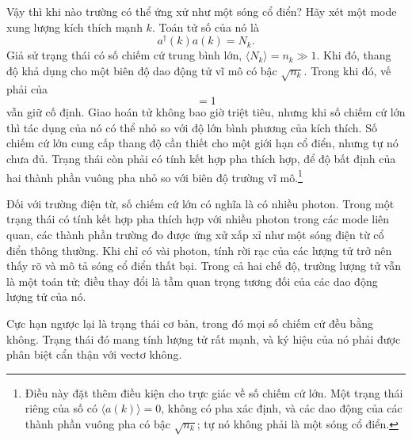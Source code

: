 Vậy thì khi nào trường có thể ứng xử như một sóng cổ điển? Hãy xét một mode xung lượng kích thích mạnh \(k\). Toán tử số của nó là
\begin{equation}
a^\dagger(k)a(k)=N_k.
\end{equation}
Giả sử trạng thái có số chiếm cứ trung bình lớn, \(\langle N_k\rangle=n_k\gg 1\). Khi đó, thang độ khả dụng cho một biên độ dao động tử vĩ mô có bậc \(\sqrt{n_k}\). Trong khi đó, vế phải của
\begin{equation}
[a(k),a^\dagger(k)]=1
\end{equation}
vẫn giữ cố định. Giao hoán tử không bao giờ triệt tiêu, nhưng khi số chiếm cứ lớn thì tác dụng của nó có thể nhỏ so với độ lớn bình phương của kích thích. Số chiếm cứ lớn cung cấp thang độ cần thiết cho một giới hạn cổ điển, nhưng tự nó chưa đủ. Trạng thái còn phải có tính kết hợp pha thích hợp, để độ bất định của hai thành phần vuông pha nhỏ so với biên độ trường vĩ mô.\footnote{Điều này đặt thêm điều kiện cho trực giác về số chiếm cứ lớn. Một trạng thái riêng của số có \(\langle a(k)\rangle=0\), không có pha xác định, và các dao động của các thành phần vuông pha có bậc \(\sqrt{n_k}\); tự nó không phải là một sóng cổ điển.}

Đối với trường điện từ, số chiếm cứ lớn có nghĩa là có nhiều photon. Trong một trạng thái có tính kết hợp pha thích hợp với nhiều photon trong các mode liên quan, các thành phần trường đo được ứng xử xấp xỉ như một sóng điện từ cổ điển thông thường. Khi chỉ có vài photon, tính rời rạc của các lượng tử trở nên thấy rõ và mô tả sóng cổ điển thất bại. Trong cả hai chế độ, trường lượng tử vẫn là một toán tử; điều thay đổi là tầm quan trọng tương đối của các dao động lượng tử của nó.

\begin{classroomqa}
\end{classroomqa}

Cực hạn ngược lại là trạng thái cơ bản, trong đó mọi số chiếm cứ đều bằng không. Trạng thái đó mang tính lượng tử rất mạnh, và ký hiệu của nó phải được phân biệt cẩn thận với vectơ không.

\begin{classroomqa}
\end{classroomqa}

